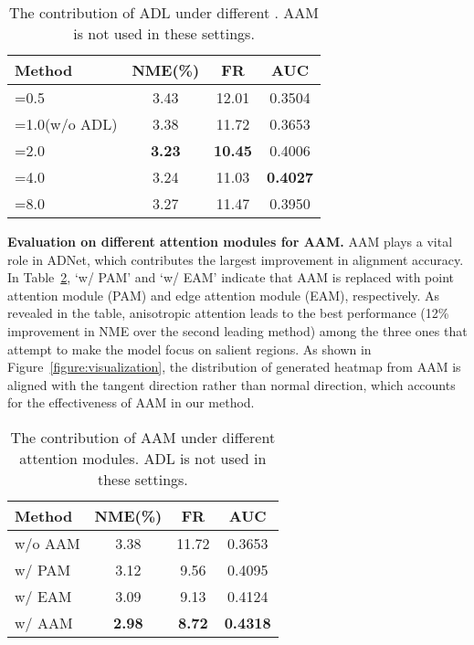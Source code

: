 \documentclass[10pt,twocolumn,letterpaper]{article}
\begin{document}
\begin{table}[t]
\begin{center}
\begin{tabular}{|l|c|c|c|}
\hline
Method & NME(\%) & FR & AUC \\
\hline
=0.5 & 3.43 & 12.01 & 0.3504 \\
\hline
=1.0(w/o ADL) & 3.38 & 11.72 & 0.3653 \\
\hline
=2.0 & \textbf{3.23} & \textbf{10.45} & 0.4006 \\
\hline
=4.0 & 3.24 & 11.03 & \textbf{0.4027} \\
\hline
=8.0 & 3.27 & 11.47 & 0.3950 \\
\hline
\end{tabular}
\end{center}
\caption{The contribution of ADL under different . AAM is not used in these settings.
}
\label{table:loss}
\vspace{-2.0em}
\end{table}


\vspace{5pt}
\noindent\textbf{Evaluation on different attention modules for AAM.}
AAM plays a vital role in ADNet, which contributes the largest improvement in alignment accuracy.
In Table~\ref{table:modules}, `w/ PAM' and `w/ EAM' indicate that AAM is replaced with point attention module (PAM) and edge attention module (EAM), respectively. 
As revealed in the table, anisotropic attention leads to the best performance (12\% improvement in NME over the second leading method) among the three ones that attempt to make the model focus on salient regions.
As shown in Figure~\ref{figure:visualization}, the distribution of generated heatmap from AAM is aligned with the tangent direction rather than normal direction, which accounts for the effectiveness of AAM in our method. 

\begin{table}[t]
\begin{center}
\begin{tabular}{|l|c|c|c|}
\hline
Method & NME(\%) & FR & AUC \\
\hline
w/o AAM & 3.38 & 11.72 & 0.3653 \\
\hline
w/ PAM & 3.12 & 9.56 & 0.4095 \\
\hline
w/ EAM & 3.09 & 9.13 & 0.4124 \\
\hline
w/ AAM & \textbf{2.98} & \textbf{8.72} & \textbf{0.4318} \\
\hline
\end{tabular}
\end{center}
\caption{The contribution of AAM under different attention modules. 
ADL is not used in these settings.
}
\label{table:modules}
\vspace{-2.0em}
\end{table}
\end{document}
